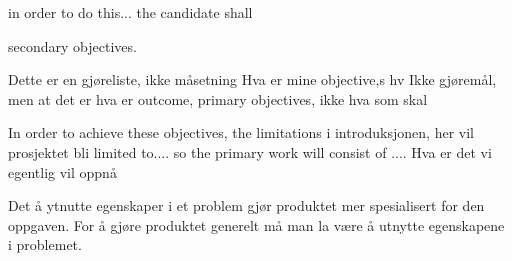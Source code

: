 in order to do this...
the candidate shall

secondary objectives. 

Dette er en gjøreliste, ikke måsetning
Hva er mine objective,s hv
Ikke gjøremål, men at det er hva er outcome, primary objectives, ikke hva som skal 

In order to achieve these objectives, the 
limitations i introduksjonen, her vil prosjektet bli limited to.... so the primary work will consist of ....
Hva er det vi egentlig vil oppnå

Det å ytnutte egenskaper i et problem gjør produktet mer spesialisert for den oppgaven. For å gjøre produktet generelt må man la være å utnytte egenskapene i problemet.
